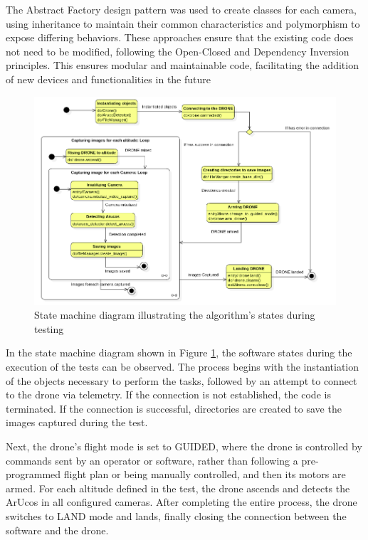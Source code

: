 \documentclass[letterpaper]{article}
\begin{document}
The Abstract Factory design pattern was used to create classes for each camera, using inheritance to maintain their common characteristics and polymorphism to expose differing behaviors. These approaches ensure that the existing code does not need to be modified, following the Open-Closed and Dependency Inversion principles. This ensures modular and maintainable code, facilitating the addition of new devices and functionalities in the future

\begin{figure}[H]
\centering
\includegraphics[width=1\columnwidth]{state_machine_diagram.png}
\caption{State machine diagram illustrating the algorithm's states during testing}
\label{figure:state_machine_diagram}
\end{figure}

In the state machine diagram shown in Figure \ref{figure:state_machine_diagram}, the software states during the execution of the tests can be observed. The process begins with the instantiation of the objects necessary to perform the tasks, followed by an attempt to connect to the drone via telemetry. If the connection is not established, the code is terminated. If the connection is successful, directories are created to save the images captured during the test.

Next, the drone’s flight mode is set to GUIDED, where the drone is controlled by commands sent by an operator or software, rather than following a pre-programmed flight plan or being manually controlled, and then its motors are armed. For each altitude defined in the test, the drone ascends and detects the ArUcos in all configured cameras. After completing the entire process, the drone switches to LAND mode and lands, finally closing the connection between the software and the drone.
\end{document}
